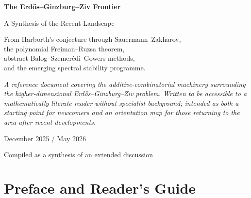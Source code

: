 \documentclass[11pt,a4paper]{article}
\theoremstyle{plain}
\theoremstyle{definition}
\theoremstyle{remark}
\begin{document}
\begin{titlepage}
\centering
\vspace*{2cm}

{\Huge\bfseries The Erd\H{o}s--Ginzburg--Ziv Frontier\par}
\vspace{0.5cm}
{\LARGE A Synthesis of the Recent Landscape\par}
\vspace{2cm}

{\large
From Harborth's conjecture through Sauermann--Zakharov,\\[0.4em]
the polynomial Freiman--Ruzsa theorem,\\[0.4em]
abstract Balog--Szemer\'edi--Gowers methods,\\[0.4em]
and the emerging spectral stability programme.\\}

\vspace{2.5cm}
\begin{minipage}{0.85\textwidth}
\itshape\small
A reference document covering the additive-combinatorial machinery surrounding the higher-dimensional Erd\H{o}s--Ginzburg--Ziv problem. Written to be accessible to a mathematically literate reader without specialist background; intended as both a starting point for newcomers and an orientation map for those returning to the area after recent developments.
\end{minipage}

\vfill

{\large December 2025 / May 2026\par}
\vspace{1em}
{\small Compiled as a synthesis of an extended discussion}

\end{titlepage}

\tableofcontents
\newpage

\section*{Preface and Reader's Guide}
\end{document}
